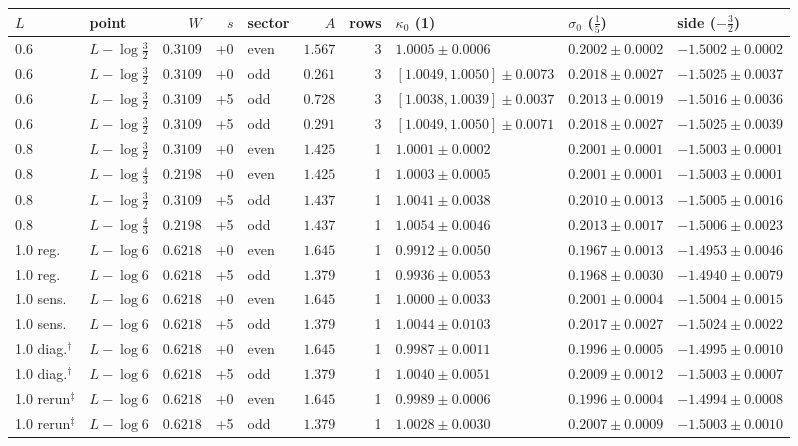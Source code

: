 \begin{tabular}{llrrlrrlll}
\toprule
$L$ & point & $W$ & $s$ & sector & $A$ & rows & $\kappa_0$ (1) & $\sigma_0$ ($\frac15$) & side ($-\frac32$) \\
\midrule
0.6 & $L-\log\frac{3}{2}$ & $0.3109$ & +0 & even & $1.567$ & 3 & $1.0005\pm0.0006$ & $0.2002\pm0.0002$ & $-1.5002\pm0.0002$ \\
0.6 & $L-\log\frac{3}{2}$ & $0.3109$ & +0 & odd & $0.261$ & 3 & $[1.0049,1.0050]\pm0.0073$ & $0.2018\pm0.0027$ & $-1.5025\pm0.0037$ \\
0.6 & $L-\log\frac{3}{2}$ & $0.3109$ & +5 & odd & $0.728$ & 3 & $[1.0038,1.0039]\pm0.0037$ & $0.2013\pm0.0019$ & $-1.5016\pm0.0036$ \\
0.6 & $L-\log\frac{3}{2}$ & $0.3109$ & +5 & odd & $0.291$ & 3 & $[1.0049,1.0050]\pm0.0071$ & $0.2018\pm0.0027$ & $-1.5025\pm0.0039$ \\
0.8 & $L-\log\frac{3}{2}$ & $0.3109$ & +0 & even & $1.425$ & 1 & $1.0001\pm0.0002$ & $0.2001\pm0.0001$ & $-1.5003\pm0.0001$ \\
0.8 & $L-\log\frac{4}{3}$ & $0.2198$ & +0 & even & $1.425$ & 1 & $1.0003\pm0.0005$ & $0.2001\pm0.0001$ & $-1.5003\pm0.0001$ \\
0.8 & $L-\log\frac{3}{2}$ & $0.3109$ & +5 & odd & $1.437$ & 1 & $1.0041\pm0.0038$ & $0.2010\pm0.0013$ & $-1.5005\pm0.0016$ \\
0.8 & $L-\log\frac{4}{3}$ & $0.2198$ & +5 & odd & $1.437$ & 1 & $1.0054\pm0.0046$ & $0.2013\pm0.0017$ & $-1.5006\pm0.0023$ \\
1.0 reg. & $L-\log6$ & $0.6218$ & +0 & even & $1.645$ & 1 & $0.9912\pm0.0050$ & $0.1967\pm0.0013$ & $-1.4953\pm0.0046$ \\
1.0 reg. & $L-\log6$ & $0.6218$ & +5 & odd & $1.379$ & 1 & $0.9936\pm0.0053$ & $0.1968\pm0.0030$ & $-1.4940\pm0.0079$ \\
1.0 sens. & $L-\log6$ & $0.6218$ & +0 & even & $1.645$ & 1 & $1.0000\pm0.0033$ & $0.2001\pm0.0004$ & $-1.5004\pm0.0015$ \\
1.0 sens. & $L-\log6$ & $0.6218$ & +5 & odd & $1.379$ & 1 & $1.0044\pm0.0103$ & $0.2017\pm0.0027$ & $-1.5024\pm0.0022$ \\
1.0 diag.$^\dagger$ & $L-\log6$ & $0.6218$ & +0 & even & $1.645$ & 1 & $0.9987\pm0.0011$ & $0.1996\pm0.0005$ & $-1.4995\pm0.0010$ \\
1.0 diag.$^\dagger$ & $L-\log6$ & $0.6218$ & +5 & odd & $1.379$ & 1 & $1.0040\pm0.0051$ & $0.2009\pm0.0012$ & $-1.5003\pm0.0007$ \\
1.0 rerun$^\ddagger$ & $L-\log6$ & $0.6218$ & +0 & even & $1.645$ & 1 & $0.9989\pm0.0006$ & $0.1996\pm0.0004$ & $-1.4994\pm0.0008$ \\
1.0 rerun$^\ddagger$ & $L-\log6$ & $0.6218$ & +5 & odd & $1.379$ & 1 & $1.0028\pm0.0030$ & $0.2007\pm0.0009$ & $-1.5003\pm0.0010$ \\
\bottomrule
\end{tabular}
